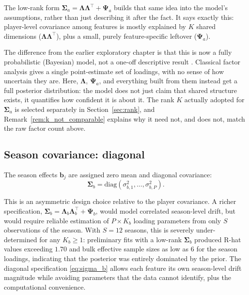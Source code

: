 The low-rank form $\boldsymbol{\Sigma}_a = \boldsymbol{\Lambda}\boldsymbol{\Lambda}^\top + \boldsymbol{\Psi}_a$ builds that same idea into the model's assumptions, rather than just describing it after the fact. It says exactly this: player-level covariance among features is mostly explained by $K$ shared dimensions ($\boldsymbol{\Lambda}\boldsymbol{\Lambda}^\top$), plus a small, purely feature-specific leftover ($\boldsymbol{\Psi}_a$).

The difference from the earlier exploratory chapter is that this is now a fully probabilistic (Bayesian) model, not a one-off descriptive result \cite{lopes2004bayesian}. Classical factor analysis gives a single point-estimate set of loadings, with no sense of how uncertain they are. Here, $\boldsymbol{\Lambda}$, $\boldsymbol{\Psi}_a$, and everything built from them instead get a full posterior distribution: the model does not just claim that shared structure exists, it quantifies how confident it is about it. The rank $K$ actually adopted for $\boldsymbol{\Sigma}_a$ is selected separately in Section~\ref{sec:rank}, and Remark~\ref{rem:k_not_comparable} explains why it need not, and does not, match the raw factor count above.

\subsection{Season covariance: diagonal}

\begin{remark}
\label{rem:sigma_b}
The season effects $\mathbf{b}_j$ are assigned zero mean and diagonal covariance:
\begin{equation}
\boldsymbol{\Sigma}_b = \mathrm{diag}(\sigma_{b,1}^2, \ldots, \sigma_{b,P}^2).
\label{eq:sigma_b}
\end{equation}
\end{remark}

This is an asymmetric design choice relative to the player covariance. A richer specification, $\boldsymbol{\Sigma}_b = \boldsymbol{\Lambda}_b\boldsymbol{\Lambda}_b^\top + \boldsymbol{\Psi}_b$, would model correlated season-level drift, but would require reliable estimation of $P \times K_b$ loading parameters from only $S$ observations of the season. With $S = 12$ seasons, this is severely under-determined for any $K_b \geq 1$: preliminary fits with a low-rank $\boldsymbol{\Sigma}_b$ produced R-hat values exceeding $1.70$ and bulk effective sample sizes as low as $6$ for the season loadings, indicating that the posterior was entirely dominated by the prior. The diagonal specification \eqref{eq:sigma_b} allows each feature its own season-level drift magnitude while avoiding parameters that the data cannot identify, plus the computational convenience.

